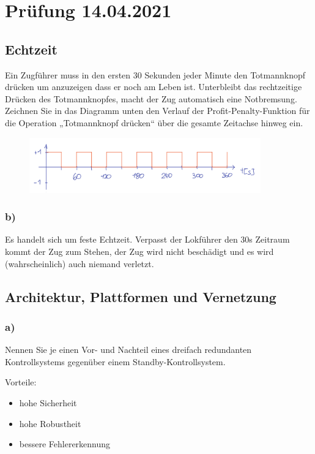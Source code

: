 \section{Prüfung 14.04.2021}
\subsection{Echtzeit}
Ein Zugführer muss in den ersten 30 Sekunden jeder Minute den Totmannknopf drücken um
anzuzeigen dass er noch am Leben ist. Unterbleibt das rechtzeitige Drücken des Totmannknopfes,
macht der Zug automatisch eine Notbremsung.
Zeichnen Sie in das Diagramm unten den Verlauf der Profit-Penalty-Funktion für die Operation
„Totmannknopf drücken“ über die gesamte Zeitachse hinweg ein.

\begin{figure}[H]
  \includegraphics[width=10cm]{images/KA140421/1a.PNG}
  \centering
\end{figure}

\subsubsection{b)}
Es handelt sich um feste Echtzeit. Verpasst der Lokführer den 30s Zeitraum kommt der Zug zum Stehen, der 
Zug wird nicht beschädigt und es wird (wahrscheinlich) auch niemand verletzt.

\subsection{Architektur, Plattformen und Vernetzung}
\subsubsection{a)}
Nennen Sie je einen Vor- und Nachteil eines dreifach redundanten Kontrollsystems gegenüber einem
Standby-Kontrollsystem.

Vorteile:
\begin{itemize}
  \item hohe Sicherheit
  \item hohe Robustheit
  \item bessere Fehlererkennung
\end{itemize}

